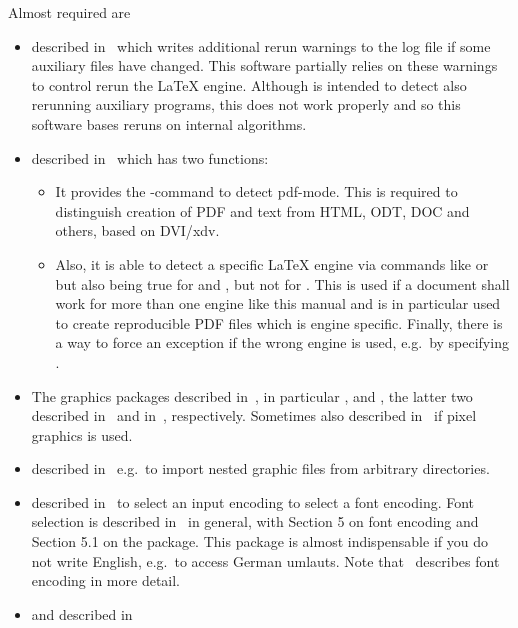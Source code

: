 \noindent
Almost required are 
%
\begin{itemize}
\item
{} described in~\cite{RerunFChkP110} 
which writes additional rerun warnings to the log file 
if some auxiliary files have changed. 
This software partially relies on these warnings 
to control rerun the \LaTeX{} engine. 
Although  is intended to detect also rerunning auxiliary programs, 
this does not work properly and so this software bases reruns on internal algorithms. 
\item
{} described in~\cite{IfTeXP} which has two functions: 
\begin{itemize}
  \item 
  It provides the -command to detect pdf-mode. 
  This is required to distinguish creation of PDF and text 
  from HTML, ODT, DOC and others, based on DVI/\gls{xdv}\@. 
  \item 
  Also, it is able to detect a specific \LaTeX{} engine via commands 
  like  or  but also  
  being true for \lualatex{} and \xelatex{}, but not for \pdflatex{}. 
  This is used if a document shall work for more than one engine 
  like this manual and is in particular used to create reproducible PDF files 
  which is engine specific. 
  Finally, there is a way to force an exception if the wrong engine is used, 
  e.g.~by specifying . 
\end{itemize}
\item
The graphics packages described in~\cite{GraX}, 
in particular ,  and , 
the latter two described in~\cite{XColorP} and in~\cite{TransP}, 
respectively. 
Sometimes also  described in~\cite{BmpP} 
if pixel graphics is used. 
\item
{} described in~\cite{ImpoP} 
e.g.~to import nested graphic files from arbitrary directories. 
\item
{} described in~\cite{InputencP} 
to select an input encoding 
 to select a font encoding. 
Font selection is described in~\cite{FontSel} in general, 
with Section 5 on font encoding and 
Section 5.1 on the  package. 
This package is almost indispensable if you do not write English, 
e.g.~to access German umlauts. 
Note that~\cite{FontEnc} describes font encoding in more detail. 
\item 
{} and  described in~\cite{MkidxShIdxP} 

\end{itemize}
